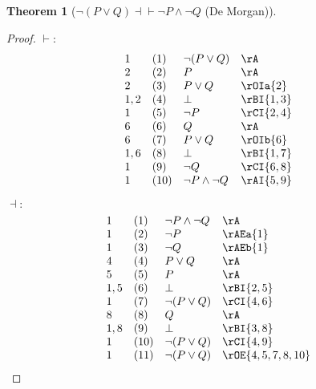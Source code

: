 \documentclass{book}
\theoremstyle{plain}
\newtheorem{theorem}{Theorem}
\theoremstyle{remark}
\theoremstyle{definition}
\begin{document}
\label{nLpPOrQRpEqvnPAndnQ}
\begin{theorem}[\(\neg(P \lor Q) \dashv \vdash \neg P \land \neg Q\) (De Morgan)]
\end{theorem}
\begin{proof}
	\(\vdash:\)
	\[
	\begin{array}{llll}
		1 & (1) & \neg(P \lor Q) & \rA \\
		2 & (2) & P & \rA \\
		2 & (3) & P \lor Q & \rOIa{2} \\
		1,2 & (4) & \bot & \rBI{1,3} \\
		1 & (5) & \neg P & \rCI{2,4} \\
		6 & (6) & Q & \rA \\
		6 & (7) & P \lor Q & \rOIb{6} \\
		1,6 & (8) & \bot & \rBI{1,7} \\
		1 & (9) & \neg Q & \rCI{6,8} \\
		1 & (10) & \neg P \land \neg Q & \rAI{5,9} \\
	\end{array}
	\]
	
	\(\dashv:\)
	\[
	\begin{array}{llll}
		1 & (1) & \neg P \land \neg Q & \rA \\
		1 & (2) & \neg P & \rAEa{1} \\
		1 & (3) & \neg Q & \rAEb{1} \\
		4 & (4) & P \lor Q & \rA \\
		5 & (5) & P & \rA \\
		1,5 & (6) & \bot & \rBI{2,5} \\
		1 & (7) & \neg (P \lor Q) & \rCI{4,6} \\
		8 & (8) & Q & \rA \\
		1,8 & (9) & \bot & \rBI{3,8} \\
		1 & (10) & \neg (P \lor Q) & \rCI{4,9} \\
		1 & (11) & \neg (P \lor Q) & \rOE{4,5,7,8,10} \\
	\end{array}
	\]
\end{proof}
\end{document}

